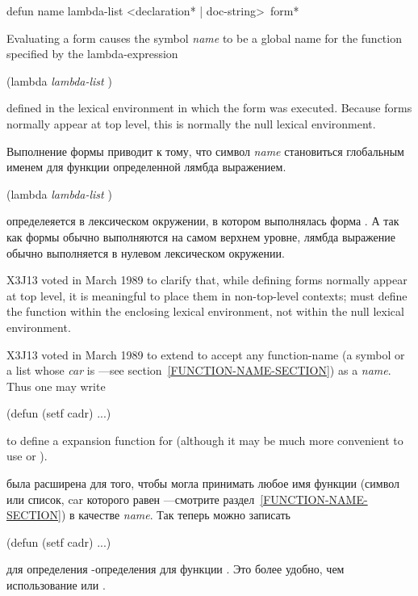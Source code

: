 \begin{defmac}
defun name lambda-list <{declaration}* | doc-string> {\,form}*

Evaluating a  form causes the symbol \textit{name} to be a global name
for the function specified by the lambda-expression
\begin{lisp}
(lambda \textit{lambda-list}  )
\end{lisp}
defined in the lexical environment in which the  form was
executed.  Because  forms normally appear at top level, this is
normally the null lexical environment.

Выполнение формы  приводит к тому, что символ \textit{name}
становиться глобальным именем для функции определенной лямбда выражением.
\begin{lisp}
(lambda \textit{lambda-list}  )
\end{lisp}
определеяется в лексическом окружении, в котором выполнялась форма
. А так как формы  обычно выполняются на самом верхнем
уровне, лямбда выражение обычно выполняется в нулевом лексическом окружении.

\begin{newer}
X3J13 voted in March 1989 
to clarify that, while defining forms normally appear at top level,
it is meaningful to place them in non-top-level contexts;
 must define the function
within the enclosing lexical environment, not within the null lexical
environment.
\end{newer}

\begin{newer}
X3J13 voted in March 1989  to extend 
to accept any function-name (a symbol or a list
whose \textit{car} is ---see section~\ref{FUNCTION-NAME-SECTION})
as a \textit{name}.
Thus one may write
\begin{lisp}
(defun (setf cadr) ...)
\end{lisp}
to define a 
expansion function for  
(although it may be much more convenient to
use  or ).

 была расширена для того, чтобы могла принимать любое имя функции
(символ или список, car которого равен ---смотрите
раздел~\ref{FUNCTION-NAME-SECTION}) в качестве \textit{name}.
Так теперь можно записать
\begin{lisp}
(defun (setf cadr) ...)
\end{lisp}
для определения -определения для функции . Это более удобно,
чем использование  или .
\end{newer}


\end{defmac}
